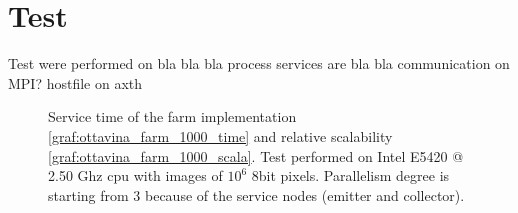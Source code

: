 \section{Test}

Test were performed on bla bla bla
process services are bla bla
communication on MPI?
hostfile on axth

\begin{figure}[p]
\centering
{}
\caption{ Service time of the farm implementation \ref{graf:ottavina_farm_1000_time} and relative scalability \ref{graf:ottavina_farm_1000_scala}. Test performed on Intel E5420 @ 2.50 Ghz cpu with images of $10^6$ 8bit pixels. Parallelism degree is starting from 3 because of the service nodes (emitter and collector). }
\label{chart:ottavina_farm_1000}
\end{figure}


